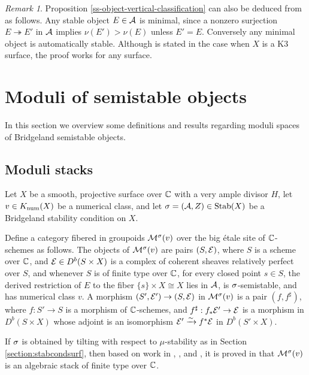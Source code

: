 \documentclass[letterpaper,12pt]{amsart}
\theoremstyle{remark}
\newtheorem{rmk}[thm]{Remark}
\begin{document}
\begin{rmk}
Proposition \ref{ss-object-vertical-classification} can also be deduced from \cite[Proposition 2.2]{huy} as follows. Any stable object $E \in \mathcal{A}$ is minimal, since a nonzero surjection $E \twoheadrightarrow E'$ in $\mathcal{A}$ implies $\nu(E') > \nu(E)$ unless $E' = E$. Conversely any minimal object is automatically stable. Although \cite[Proposition 2.2]{huy} is stated in the case when $X$ is a K3 surface, the proof works for any surface.
\end{rmk}


\section{Moduli of semistable objects}
In this section we overview some definitions and results regarding moduli spaces of Bridgeland semistable objects. 

\subsection{Moduli stacks}
Let $X$ be a smooth, projective surface over $\mathbb{C}$ with a very ample divisor $H$, let $v \in K_{\mathrm{num}}(X)$ be a numerical class, and let $\sigma = (\mathcal{A}, Z) \in \operatorname{\mathrm{Stab}}(X)$ be a Bridgeland stability condition on $X$.

Define a category fibered in groupoids $\mathcal{M}^\sigma(v)$ over the big \'etale site of $\mathbb{C}$-schemes as follows. The objects of $\mathcal{M}^\sigma(v)$ are pairs $(S, \mathcal{E})$, where $S$ is a scheme over $\mathbb{C}$, and $\mathcal{E} \in D^b(S \times X)$ is a complex of coherent sheaves relatively perfect over $S$, and whenever $S$ is of finite type over $\mathbb{C}$, for every closed point $s \in S$, the derived restriction of $E$ to the fiber $\{s\} \times X \cong X$ lies in $\mathcal{A}$, is $\sigma$-semistable, and has numerical class $v$. A morphism $(S', \mathcal{E}') \to (S, \mathcal{E})$ in $\mathcal{M}^\sigma(v)$ is a pair $(f, f^\sharp)$, where $f: S' \to S$ is a morphism of $\mathbb{C}$-schemes, and $f^\sharp: f_* \mathcal{E}' \to \mathcal{E}$ is a morphism in $D^b(S \times X)$ whose adjoint is an isomorphism $\mathcal{E}' \xrightarrow{\sim} f^* \mathcal{E}$ in $D^b(S' \times X)$.

If $\sigma$ is obtained by tilting with respect to $\mu$-stability as in Section \ref{section:stabcondsurf}, then based on work in \cite{lie06}, \cite{ABL13}, and \cite{AP06}, it is proved in \cite{toda08} that $\mathcal{M}^\sigma(v)$ is an algebraic stack of finite type over $\mathbb{C}$. 
\end{document}
